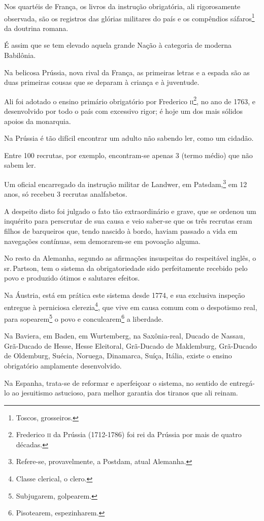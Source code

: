 Nos quartéis de França, os livros da instrução obrigatória, ali
rigorosamente observada, são os registros das glórias militares do país
e os compêndios sáfaros\footnote{Toscos, grosseiros.} da doutrina
romana.

É assim que se tem elevado aquela grande Nação à categoria de moderna
Babilônia.

Na belicosa Prússia, nova rival da França, as primeiras letras e a
espada são as duas primeiras cousas que se deparam à criança e à
juventude.

Ali foi adotado o ensino primário obrigatório por Frederico
\textsc{ii}\footnote{Frederico \textsc{ii} da Prússia (1712-1786) foi rei da Prússia por
  mais de quatro décadas.}, no ano de 1763, e desenvolvido por todo o
país com excessivo rigor; é hoje um dos mais sólidos apoios da
monarquia.

Na Prússia é tão difícil encontrar um adulto não sabendo ler, como um
cidadão.

Entre 100 recrutas, por exemplo, encontram-se apenas 3 (termo médio) que
não sabem ler.

Um oficial encarregado da instrução militar de Landwer, em
Patsdam,\footnote{Refere-se, provavelmente, a Postdam, atual Alemanha.}
em 12 anos, só recebeu 3 recrutas analfabetos.

A despeito disto foi julgado o fato tão extraordinário e grave, que se
ordenou um inquérito para perscrutar de sua causa e veio saber-se que os
três recrutas eram filhos de barqueiros que, tendo nascido à bordo,
haviam passado a vida em navegações contínuas, sem demorarem-se em
povoação alguma.

No resto da Alemanha, segundo as afirmações insuspeitas do respeitável
inglês, o sr.\,Partson, tem o sistema da obrigatoriedade sido
perfeitamente recebido pelo povo e produzido ótimos e salutares efeitos.

Na Áustria, está em prática este sistema desde 1774, e sua exclusiva
inspeção entregue à perniciosa clerezia\footnote{Classe clerical, o
  clero.}, que vive em causa comum com o despotismo real, para
sopearem\footnote{Subjugarem, golpearem.} o povo e
conculcarem\footnote{Pisotearem, espezinharem.} a liberdade.

Na Baviera, em Baden, em Wurtemberg, na Saxônia-real, Ducado de Nassau,
Grã-Ducado de Hesse, Hesse Eleitoral, Grã-Ducado de Maklemburg,
Grã-Ducado de Oldemburg, Suécia, Noruega, Dinamarca, Suíça, Itália,
existe o ensino obrigatório amplamente desenvolvido.

Na Espanha, trata-se de reformar e aperfeiçoar o sistema, no sentido de
entregá-lo ao jesuitismo astucioso, para melhor garantia dos tiranos que
ali reinam.

